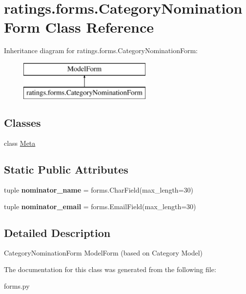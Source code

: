 \hypertarget{classratings_1_1forms_1_1CategoryNominationForm}{\section{ratings.\-forms.\-Category\-Nomination\-Form Class Reference}
\label{classratings_1_1forms_1_1CategoryNominationForm}
}
Inheritance diagram for ratings.\-forms.\-Category\-Nomination\-Form\-:\begin{figure}[H]
\begin{center}
\leavevmode
\includegraphics[height=2.000000cm]{classratings_1_1forms_1_1CategoryNominationForm}
\end{center}
\end{figure}
\subsection*{Classes}
\begin{DoxyCompactItemize}
\item 
class \hyperlink{classratings_1_1forms_1_1CategoryNominationForm_1_1Meta}{Meta}
\end{DoxyCompactItemize}
\subsection*{Static Public Attributes}
\begin{DoxyCompactItemize}
\item 
\hypertarget{classratings_1_1forms_1_1CategoryNominationForm_a9bfacd7cd84ce93a9ffa0767edc62ec1}{tuple {\bfseries nominator\-\_\-name} = forms.\-Char\-Field(max\-\_\-length=30)}\label{classratings_1_1forms_1_1CategoryNominationForm_a9bfacd7cd84ce93a9ffa0767edc62ec1}

\item 
\hypertarget{classratings_1_1forms_1_1CategoryNominationForm_a48673d290cfba7c288c7e0eeac0e4f3d}{tuple {\bfseries nominator\-\_\-email} = forms.\-Email\-Field(max\-\_\-length=30)}\label{classratings_1_1forms_1_1CategoryNominationForm_a48673d290cfba7c288c7e0eeac0e4f3d}

\end{DoxyCompactItemize}


\subsection{Detailed Description}
\begin{DoxyVerb}CategoryNominationForm ModelForm (based on Category Model)
\end{DoxyVerb}
 

The documentation for this class was generated from the following file\-:\begin{DoxyCompactItemize}
\item 
forms.\-py\end{DoxyCompactItemize}
